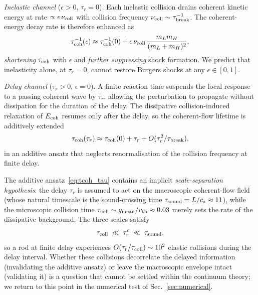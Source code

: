\documentclass[aps,pre,twocolumn,superscriptaddress,longbibliography,floatfix]{revtex4-2}
\begin{document}
\emph{Inelastic channel} ($\epsilon>0$, $\tau_r=0$).
Each inelastic collision drains coherent kinetic energy at
rate $\propto\epsilon\,\nu_{\rm coll}$ with collision
frequency $\nu_{\rm coll}\sim\tau_{\rm break}^{-1}$. The
coherent-energy decay rate is therefore enhanced as
\begin{equation}
\tau_{\rm coh}^{-1}(\epsilon) \approx \tau_{\rm coh}^{-1}(0)
+ \epsilon\,\nu_{\rm coll}\,\frac{m_L m_H}{(m_L+m_H)^2},
\label{eq:tcoh_eps}
\end{equation}
\emph{shortening} $\tau_{\rm coh}$ with $\epsilon$ and
\emph{further suppressing} shock formation. We predict that
inelasticity alone, at $\tau_r=0$, cannot restore Burgers
shocks at any $\epsilon\in[0,1]$.

\emph{Delay channel} ($\tau_r>0$, $\epsilon=0$).
A finite reaction time suspends the local response to a
passing coherent wave by $\tau_r$, allowing the
perturbation to propagate without dissipation for the
duration of the delay. The dissipative collision-induced
relaxation of $E_{\rm coh}$ resumes only after the delay,
so the coherent-flow lifetime is additively extended
\begin{equation}
\tau_{\rm coh}(\tau_r) \approx \tau_{\rm coh}(0) + \tau_r
+ O(\tau_r^2/\tau_{\rm break}),
\label{eq:tcoh_tau}
\end{equation}
in an additive ansatz that neglects renormalisation of the
collision frequency at finite delay.

The additive ansatz~\eqref{eq:tcoh_tau} contains an implicit
\emph{scale-separation hypothesis}: the delay $\tau_r$ is
assumed to act on the macroscopic coherent-flow field (whose
natural timescale is the sound-crossing time
$\tau_{\rm sound}=L/c_s\approx 11$), while the microscopic
collision time $\tau_{\rm coll}\sim g_{\rm mean}/v_{\rm th}
\approx 0.03$ merely sets the rate of the dissipative
background. The three scales satisfy
\begin{equation}
\tau_{\rm coll} \;\ll\; \tau_r^c \;\ll\; \tau_{\rm sound},
\label{eq:scale_sep}
\end{equation}
so a rod at finite delay experiences
$O(\tau_r/\tau_{\rm coll})\sim 10^2$ elastic collisions
during the delay interval. Whether these collisions
decorrelate the delayed information (invalidating the
additive ansatz) or leave the macroscopic envelope intact
(validating it) is a question that cannot be settled within
the continuum theory; we return to this point
in the numerical test of Sec.~\ref{sec:numerical}.
\end{document}
